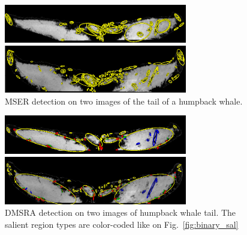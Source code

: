\documentclass[conference,compsoc]{IEEEtran}
\begin{document}
\begin{figure}[htb]

\begin{minipage}[b]{.99\linewidth}
  \centering
  \centerline{\includegraphics[width=8cm]{mserTailA}}
\end{minipage}
\vspace{0.1cm}
\begin{minipage}[b]{0.99\linewidth}
  \centering
  \centerline{\includegraphics[width=8cm]{mserTailB}}
\end{minipage}
\hfill
\caption{MSER detection on two images of the tail of a humpback whale. }
\label{fig:tails_mser}
\vspace{-0.3cm}
\end{figure}

\begin{figure}[htb]

\begin{minipage}[b]{.99\linewidth}
  \centering
  \centerline{\includegraphics[width=8cm]{dmsrTailA}}
\end{minipage}
\vspace{0.1cm}
\begin{minipage}[b]{0.99\linewidth}
  \centering
  \centerline{\includegraphics[width=8cm]{dmsrTailB}}
\end{minipage}
\hfill
\caption{DMSRA detection on two images of humpback whale tail. The salient region types are color-coded like on Fig.~\ref{fig:binary_sal}}
\label{fig:tails_dmsr}
\vspace{-0.3cm}
\end{figure}
\end{document}
